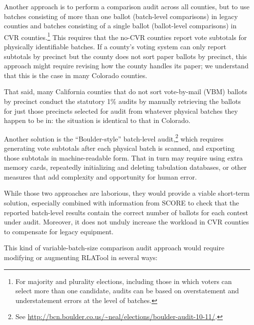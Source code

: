 \documentclass[12pt]{article}
\begin{document}
Another approach is to perform a comparison audit across all counties, but to use batches consisting
of more than one ballot (batch-level comparisons)
in legacy counties and batches consisting of a single ballot (ballot-level comparisons) in CVR counties.\footnote{%
 For majority and plurality elections, including those in which voters can select more than one candidate,
  audits can be based on overstatement and understatement errors at the level of batches.
}
This requires that the no-CVR counties report vote subtotals
for physically identifiable batches.
If a county's voting system can only report subtotals by precinct but 
the county does not sort paper ballots by
precinct, this approach might require revising how the county handles its
paper; we understand that this is the case in many Colorado counties.

That said, many California counties that do not sort vote-by-mail (VBM)
ballots by precinct conduct the statutory 1\% audits by manually retrieving the ballots 
for just those precincts selected for audit from whatever physical batches they happen to be in: 
the situation is identical to that in Colorado.

Another solution is the ``Boulder-style'' batch-level audit,\footnote{%
 See \url{http://bcn.boulder.co.us/~neal/elections/boulder-audit-10-11/}.
}
which requires generating 
vote subtotals after each physical batch is scanned, and exporting those subtotals in machine-readable form.
That in turn may require using extra memory cards, repeatedly initializing and deleting tabulation databases,
or other measures that add complexity and opportunity for human error.

While those two approaches are laborious, they would provide a viable short-term solution,
especially combined with information from SCORE to check that the reported batch-level results contain the correct number of ballots for each contest under audit.
Moreover, it does not unduly increase the workload in CVR counties
to compensate for legacy equipment.

This kind of variable-batch-size comparison audit approach would require modifying or augmenting
RLATool in several ways: 
\end{document}
